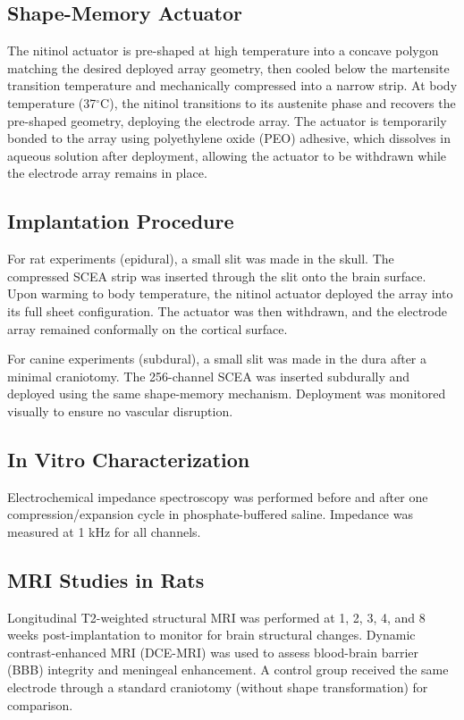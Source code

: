 \documentclass[11pt]{article}
\begin{document}
\subsection{Shape-Memory Actuator}

The nitinol actuator is pre-shaped at high temperature into a concave polygon matching the desired deployed array geometry, then cooled below the martensite transition temperature and mechanically compressed into a narrow strip. At body temperature (37$^{\circ}$C), the nitinol transitions to its austenite phase and recovers the pre-shaped geometry, deploying the electrode array. The actuator is temporarily bonded to the array using polyethylene oxide (PEO) adhesive, which dissolves in aqueous solution after deployment, allowing the actuator to be withdrawn while the electrode array remains in place.

\subsection{Implantation Procedure}

For rat experiments (epidural), a small slit was made in the skull. The compressed SCEA strip was inserted through the slit onto the brain surface. Upon warming to body temperature, the nitinol actuator deployed the array into its full sheet configuration. The actuator was then withdrawn, and the electrode array remained conformally on the cortical surface.

For canine experiments (subdural), a small slit was made in the dura after a minimal craniotomy. The 256-channel SCEA was inserted subdurally and deployed using the same shape-memory mechanism. Deployment was monitored visually to ensure no vascular disruption.

\subsection{In Vitro Characterization}

Electrochemical impedance spectroscopy was performed before and after one compression/expansion cycle in phosphate-buffered saline. Impedance was measured at 1 kHz for all channels.

\subsection{MRI Studies in Rats}

Longitudinal T2-weighted structural MRI was performed at 1, 2, 3, 4, and 8 weeks post-implantation to monitor for brain structural changes. Dynamic contrast-enhanced MRI (DCE-MRI) was used to assess blood-brain barrier (BBB) integrity and meningeal enhancement. A control group received the same electrode through a standard craniotomy (without shape transformation) for comparison.
\end{document}
